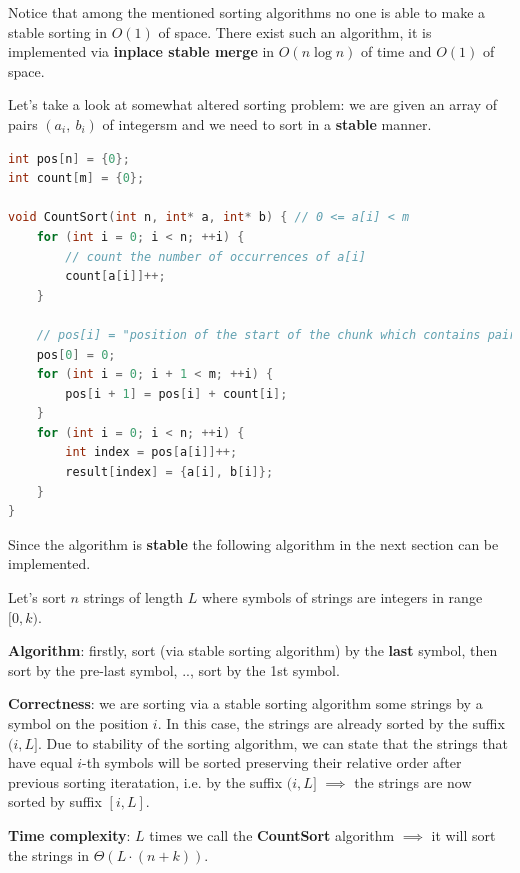 Notice that among the mentioned sorting algorithms no one is able to make a stable sorting in $O(1)$ of space. There exist such an algorithm, it is implemented via \textbf{inplace stable merge} in $O(n \log{n})$ of time and $O(1)$ of space.



Let's take a look at somewhat altered sorting problem: we are given an array of pairs $(a_i,\ b_i)$ of integersm and we need to sort in a \textbf{stable} manner.

\begin{lstlisting}[language=C++]
int pos[n] = {0};
int count[m] = {0};

void CountSort(int n, int* a, int* b) { // 0 <= a[i] < m
    for (int i = 0; i < n; ++i) {
        // count the number of occurrences of a[i]
        count[a[i]]++;
    }

    // pos[i] = "position of the start of the chunk which contains pairs <i, ?>"
    pos[0] = 0;
    for (int i = 0; i + 1 < m; ++i) {
        pos[i + 1] = pos[i] + count[i];
    }
    for (int i = 0; i < n; ++i) {
        int index = pos[a[i]]++;
        result[index] = {a[i], b[i]};
    }
}
\end{lstlisting}

Since the algorithm is \textbf{stable} the following algorithm in the next section can be implemented.



Let's sort $n$ strings of length $L$ where symbols of strings are integers in range $[0, k)$.

\textbf{Algorithm}: firstly, sort (via stable sorting algorithm) by the \textbf{last} symbol, then sort by the pre-last symbol, .., sort by the 1st symbol.

\textbf{Correctness}: we are sorting via a stable sorting algorithm some strings by a symbol on the position $i$. In this case, the strings are already sorted by the suffix $(i, L]$. Due to stability of the sorting algorithm, we can state that the strings that have equal $i$-th symbols will be sorted preserving their relative order after previous sorting iteratation, i.e. by the suffix $(i, L]$ $\implies$ the strings are now sorted by suffix $[i, L]$.

\textbf{Time complexity}: $L$ times we call the \textbf{CountSort} algorithm $\implies$ it will sort the strings in $\Theta(L \cdot (n + k))$.

